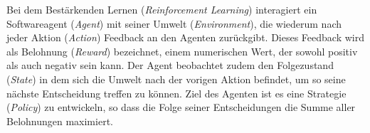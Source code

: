 Bei dem Bestärkenden Lernen (\textit{Reinforcement Learning}) interagiert ein Softwareagent (\textit{Agent}) mit seiner Umwelt (\textit{Environment}), die wiederum nach jeder Aktion (\textit{Action}) Feedback an den Agenten zurückgibt. Dieses Feedback wird als Belohnung (\textit{Reward}) bezeichnet, einem numerischen Wert, der sowohl positiv als auch negativ sein kann. Der Agent beobachtet zudem den Folgezustand (\textit{State}) in dem sich die Umwelt nach der vorigen Aktion befindet, um so seine nächste Entscheidung treffen zu können. Ziel des Agenten ist es eine Strategie (\textit{Policy}) zu entwickeln, so dass die Folge seiner Entscheidungen die Summe aller Belohnungen maximiert.